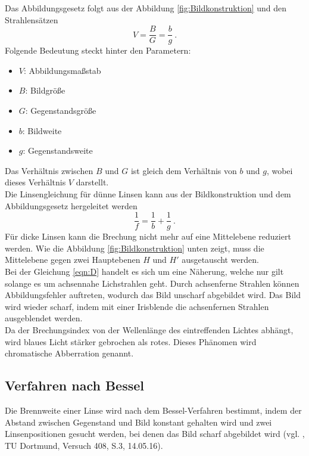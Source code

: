 Das Abbildungsgesetz folgt aus der Abbildung \eqref{fig:Bildkonstruktion} und den Strahlensätzen
\begin{equation}
	V = \frac{B}{G} = \frac{b}{g} \ .
	\label{eqn:V}
\end{equation}
Folgende Bedeutung steckt hinter den Parametern:
\begin{itemize}
	\item $V$: Abbildungsmaßstab
	\item $B$: Bildgröße
	\item $G$: Gegenstandsgröße
	\item $b$: Bildweite
	\item $g$: Gegenstandsweite
\end{itemize}
Das Verhältnis zwischen $B$ und $G$ ist gleich dem Verhältnis von $b$ und $g$, wobei dieses Verhältnis $V$ darstellt. \\
Die Linsengleichung für dünne Linsen kann aus der Bildkonstruktion und dem Abbildungsgesetz hergeleitet werden
\begin{equation}
	\frac{1}{f} = \frac{1}{b} + \frac{1}{g} \ .
	\label{eqn:D}
\end{equation}
Für dicke Linsen kann die Brechung nicht mehr auf eine Mittelebene reduziert werden. Wie die Abbildung \eqref{fig:Bildkonstruktion} unten zeigt, muss die Mittelebene gegen zwei Hauptebenen $H$ und $H'$ ausgetauscht werden. \\
Bei der Gleichung \eqref{eqn:D} handelt es sich um eine Näherung, welche nur gilt solange es um achsennahe Lichstrahlen geht. Durch achsenferne Strahlen können Abbildungsfehler auftreten, wodurch das Bild unscharf abgebildet wird. Das Bild wird wieder scharf, indem mit einer Irisblende die achsenfernen Strahlen ausgeblendet werden. \\
Da der Brechungsindex von der Wellenlänge des eintreffenden Lichtes abhängt, wird blaues Licht stärker gebrochen als rotes. Dieses Phänomen wird chromatische Abberration genannt.

\subsection{Verfahren nach Bessel}
Die Brennweite einer Linse wird nach dem Bessel-Verfahren bestimmt, indem der Abstand zwischen Gegenstand und Bild konstant gehalten wird und zwei Linsenpositionen gesucht werden, bei denen das Bild scharf abgebildet wird
(vgl. \cite{sample}, TU Dortmund, Versuch 408, S.3, 14.05.16).

